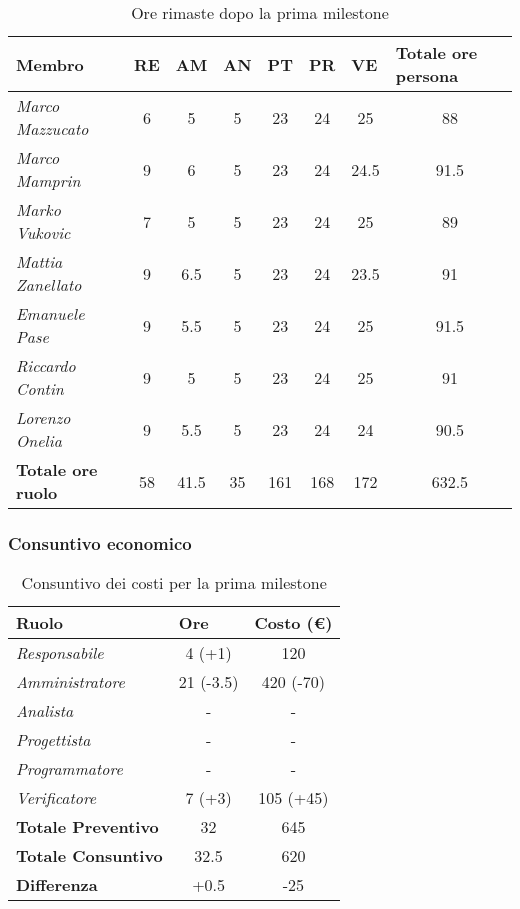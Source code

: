 \begin{table}[!ht]
    \centering
    \begin{tabular}{|l|c|c|c|c|c|c|c|}
    \hline
    \textbf{Membro} & \multicolumn{1}{l|}{\textbf{RE}} & \multicolumn{1}{l|}{\textbf{AM}} & \multicolumn{1}{l|}{\textbf{AN}} & \multicolumn{1}{l|}{\textbf{PT}} & \multicolumn{1}{l|}{\textbf{PR}} & \multicolumn{1}{l|}{\textbf{VE}} & \multicolumn{1}{l|}{\textbf{Totale ore persona}} \\ \hline
    \textit{Marco Mazzucato}  & 6  & 5   & 5  & 23  & 24 & 25   & 88   \\ \hline
    \textit{Marco Mamprin}    & 9  & 6   & 5  & 23  & 24 & 24.5 & 91.5 \\ \hline
    \textit{Marko Vukovic}    & 7  & 5   & 5  & 23  & 24 & 25   & 89   \\ \hline
    \textit{Mattia Zanellato} & 9  & 6.5 & 5  & 23  & 24 & 23.5 & 91   \\ \hline
    \textit{Emanuele Pase}    & 9  & 5.5 & 5  & 23  & 24 & 25   & 91.5 \\ \hline
    \textit{Riccardo Contin}  & 9  & 5   & 5  & 23  & 24 & 25   & 91   \\ \hline
    \textit{Lorenzo Onelia}   & 9  & 5.5 & 5  & 23  & 24 & 24   & 90.5 \\ \hline
    \textbf{Totale ore ruolo} & 58 & 41.5& 35 & 161 & 168& 172  & 632.5\\ \hline
    \end{tabular}
    \caption{Ore rimaste dopo la prima milestone}
\end{table}

\subsubsection{Consuntivo economico}

\begin{table}[!ht]
    \centering
    \begin{tabular}{|l|c|c|}
    \hline
    \textbf{Ruolo} & \multicolumn{1}{l|}{\textbf{Ore}} & \multicolumn{1}{l|}{\textbf{Costo (€)}} \\ \hline
    \textit{Responsabile}      & 4 (+1)    & 120       \\ \hline
    \textit{Amministratore}    & 21 (-3.5) & 420 (-70) \\ \hline
    \textit{Analista}          & -         & -         \\ \hline
    \textit{Progettista}       & -         & -         \\ \hline
    \textit{Programmatore}     & -         & -         \\ \hline
    \textit{Verificatore}      & 7 (+3)    & 105 (+45) \\ \hline
    \textbf{Totale Preventivo} & 32        & 645       \\ \hline
    \textbf{Totale Consuntivo} & 32.5      & 620       \\ \hline
    \textbf{Differenza}        & +0.5      & -25       \\ \hline
    \end{tabular}
    \caption{Consuntivo dei costi per la prima milestone}
\end{table}

